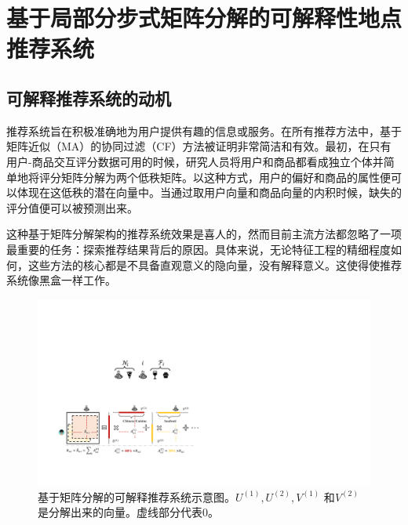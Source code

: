 
\chapter{基于局部分步式矩阵分解的可解释性地点推荐系统}
\label{chapter:main3}

\section{可解释推荐系统的动机}
推荐系统旨在积极准确地为用户提供有趣的信息或服务。在所有推荐方法中，基于矩阵近似（MA）的协同过滤（CF）方法被证明非常简洁和有效。最初，在只有用户-商品交互评分数据可用的时候，研究人员将用户和商品都看成独立个体并简单地将评分矩阵分解为两个低秩矩阵\cite{paterek2007improving,weightedSVD,mnih2008probabilistic,rennie2005fast,salakhutdinov2008bayesian}。以这种方式，用户的偏好和商品的属性便可以体现在这低秩的潜在向量中。当通过取用户向量和商品向量的内积时候，缺失的评分值便可以被预测出来。

这种基于矩阵分解架构的推荐系统效果是喜人的，然而目前主流方法都忽略了一项最重要的任务：探索推荐结果背后的原因。具体来说，无论特征工程的精细程度如何，这些方法的核心都是不具备直观意义的隐向量，没有解释意义。这使得使推荐系统像黑盒一样工作。



\begin{figure}[t!]
\includegraphics[width=\textwidth]{pics/explain.pdf}
\caption{基于矩阵分解的可解释推荐系统示意图。$U^{(1)},U^{(2)},V^{(1)}$ 和$V^{(2)}$ 是分解出来的向量。虚线部分代表0。} 
\label{explain}
\end{figure}

